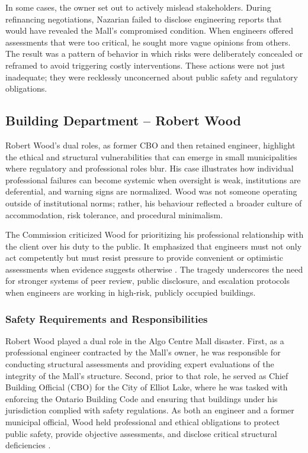 \documentclass[12pt]{article}
\begin{document}
In some cases, the owner set out to actively mislead stakeholders. During refinancing negotiations, Nazarian failed to disclose engineering reports that would have revealed the Mall's compromised condition. When engineers offered assessments that were too critical, he sought more vague opinions from others. The result was a pattern of behavior in which risks were deliberately concealed or reframed to avoid triggering costly interventions. These actions were not just inadequate; they were recklessly unconcerned about public safety and regulatory obligations.

\subsection{Building Department – Robert Wood}

Robert Wood's dual roles, as former CBO and then retained engineer, highlight the ethical and structural vulnerabilities that can emerge in small municipalities where regulatory and professional roles blur. His case illustrates how individual professional failures can become systemic when oversight is weak, institutions are deferential, and warning signs are normalized. Wood was not someone operating outside of institutional norms; rather, his behaviour reflected a broader culture of accommodation, risk tolerance, and procedural minimalism.

The Commission criticized Wood for prioritizing his professional relationship with the client over his duty to the public. It emphasized that engineers must not only act competently but must resist pressure to provide convenient or optimistic assessments when evidence suggests otherwise \cite[393-396]{AlgoLakeReport1}. The tragedy underscores the need for stronger systems of peer review, public disclosure, and escalation protocols when engineers are working in high-risk, publicly occupied buildings.

\subsubsection*{Safety Requirements and Responsibilities}

Robert Wood played a dual role in the Algo Centre Mall disaster. First, as a professional engineer contracted by the Mall's owner, he was responsible for conducting structural assessments and providing expert evaluations of the integrity of the Mall's structure. Second, prior to that role, he served as Chief Building Official (CBO) for the City of Elliot Lake, where he was tasked with enforcing the Ontario Building Code and ensuring that buildings under his jurisdiction complied with safety regulations. As both an engineer and a former municipal official, Wood held professional and ethical obligations to protect public safety, provide objective assessments, and disclose critical structural deficiencies \cite[p374-377, p387-388, p393-396]{AlgoLakeReport1}.
\end{document}
